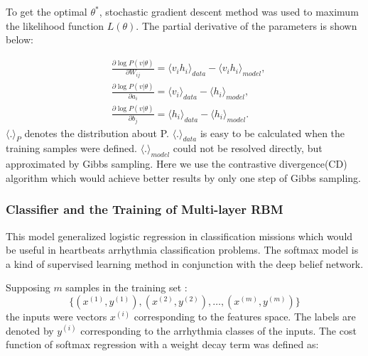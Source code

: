 \documentclass[graybox]{svmult}
\begin{document}
To get the optimal $\theta^*$, stochastic gradient descent\citep[e.g.][]{leon2010large} method was used to maximum the likelihood function $L(\theta)$. The partial derivative of the parameters is shown below:

\begin{equation}
\begin{split}
&\frac{\partial\log P(v|\theta)}{\partial W_{ij}} = \langle v_i h_i \rangle_{data} -\langle v_i h_i \rangle_{model},\\
&\frac{\partial\log P(v|\theta)}{\partial a_{i}} = \langle v_i \rangle_{data} -\langle h_i \rangle_{model},\\
&\frac{\partial\log P(v|\theta)}{\partial b_{j}} = \langle h_i \rangle_{data} -\langle h_i \rangle_{model}.
\end{split}
\end{equation}
$\langle . \rangle_P$ denotes the distribution about P. $\langle . \rangle_{data}$ is easy to be calculated when the training samples were defined. $\langle . \rangle_{model}$ could not be resolved directly, but approximated by Gibbs sampling. Here we use the contrastive divergence(CD) algorithm\citep{hinton2002training} which would achieve better results by only one step of Gibbs sampling.

\subsubsection{Classifier and the Training of Multi-layer RBM}
This model generalized logistic regression\citep{peng2002intro} in classification missions which would be useful in heartbeats arrhythmia classification problems. The softmax model is a kind of supervised learning method in conjunction with the deep belief network.

Supposing $m$ samples in the training set :
\begin{equation}
\{(x^{(1)},y^{(1)}), (x^{(2)},y^{(2)}), \ldots, (x^{(m)},y^{(m)}) \}
\end{equation}
the inputs were vectors $x^{(i)}$ corresponding to the features space. The labels are denoted by $y^{(i)}$  corresponding to the arrhythmia classes of the inputs.
The cost function of softmax regression with a weight decay term was defined as:
\end{document}
